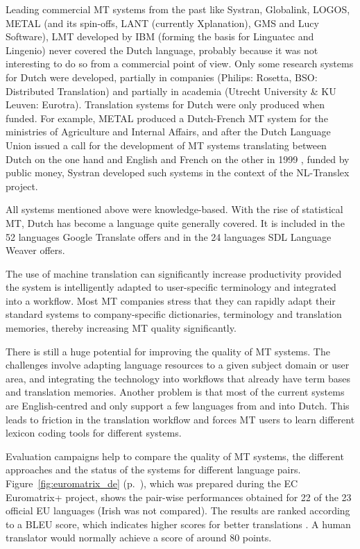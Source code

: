 \documentclass[]{../../metanetpaper}
\begin{document}
\begin{multicols}{2}
    Leading commercial MT systems from the past like Systran, Globalink, LOGOS, METAL (and its spin-offs, LANT (currently Xplanation), GMS and Lucy Software), LMT developed by IBM (forming the basis for Linguatec  and Lingenio) never covered the Dutch language, probably because it was not interesting to do so from a commercial point of view. Only some research systems for Dutch were developed, partially in companies (Philips: Rosetta, BSO: Distributed Translation) and partially in academia (Utrecht University \& KU Leuven: Eurotra). Translation systems for Dutch were only produced when funded. For example, METAL produced a Dutch-French MT system for the ministries of Agriculture and Internal Affairs, and after the Dutch Language Union issued a call for the development of MT systems translating between Dutch on the one hand and English and French on the other in 1999 \cite{Cucchiarini:etal:2000},  funded by public money, Systran developed such systems in the context of the NL-Translex project.

    All systems mentioned above were knowledge-based. With the rise of statistical MT, Dutch has become a language quite generally covered. It is included in the 52 languages Google Translate offers and in the 24 languages SDL Language Weaver offers.

    The use of machine translation can significantly increase productivity provided the system is intelligently adapted to user-specific terminology and integrated into a workflow. Most MT companies stress that they can rapidly adapt their standard systems to company-specific dictionaries, terminology and translation memories, thereby increasing MT quality significantly.

There is still a huge potential for improving the quality of MT systems. The challenges involve adapting language resources to a given subject domain or user area, and integrating the technology into workflows that already have term bases and translation memories. Another problem is that most of the current systems are English-centred and only support a few languages from and into Dutch. This leads to friction in the translation workflow and forces MT users to learn different lexicon coding tools for different systems.

Evaluation campaigns help to compare the quality of MT systems, the different approaches and the status of the systems for different language pairs. Figure~\ref{fig:euromatrix_de} (p.~\pageref{fig:euromatrix_de}), which was prepared during the EC Euromatrix+ project, shows the pair-wise performances obtained for 22 of the 23 official EU languages (Irish was not compared). The results are ranked according to a BLEU score, which indicates higher scores for better translations \cite{bleu1}. A human translator would normally achieve a score of around 80 points.


\end{multicols}
\end{document}
